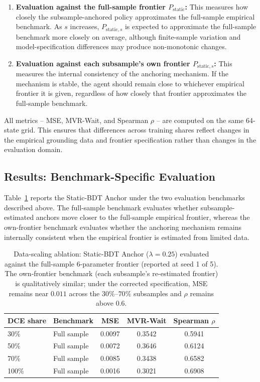 \documentclass[11pt]{article}
\begin{document}
\begin{enumerate}
    \item \textbf{Evaluation against the full-sample frontier \(P_{\mathrm{static}}\):} This measures how closely the subsample-anchored policy approximates the full-sample empirical benchmark. As \(s\) increases, \(P_{\mathrm{static},s}\) is expected to approximate the full-sample benchmark more closely on average, although finite-sample variation and model-specification differences may produce non-monotonic changes.

    \item \textbf{Evaluation against each subsample's own frontier \(P_{\mathrm{static},s}\):} This measures the internal consistency of the anchoring mechanism. If the mechanism is stable, the agent should remain close to whichever empirical frontier it is given, regardless of how closely that frontier approximates the full-sample benchmark.
\end{enumerate}

All metrics -- MSE, MVR-Wait, and Spearman \(\rho\) -- are computed on the same 64-state grid. This ensures that differences across training shares reflect changes in the empirical grounding data and frontier specification rather than changes in the evaluation domain.
\subsection{Results: Benchmark-Specific Evaluation}
\label{app:results_vs_full}

Table~\ref{tab:data_scaling_benchmarks} reports the Static-BDT Anchor under the two evaluation benchmarks described above. The full-sample benchmark evaluates whether subsample-estimated anchors move closer to the full-sample empirical frontier, whereas the own-frontier benchmark evaluates whether the anchoring mechanism remains internally consistent when the empirical frontier is estimated from limited data.

\begin{table}[htbp]
\centering
\caption{Data-scaling ablation: Static-BDT Anchor (\(\lambda = 0.25\)) evaluated against the full-sample 6-parameter frontier (reported at seed 1 of 5). The own-frontier benchmark (each subsample's re-estimated frontier) is qualitatively similar; under the corrected specification, MSE remains near $0.011$ across the $30\%$--$70\%$ subsamples and $\rho$ remains above $0.6$.}
\label{tab:data_scaling_benchmarks}
\begin{tabular}{llccc}
\toprule
DCE share & Benchmark & MSE & MVR-Wait & Spearman \(\rho\) \\
\midrule
30\% & Full sample & 0.0097 & 0.3542 & 0.5941 \\
50\% & Full sample & 0.0072 & 0.3646 & 0.6124 \\
70\% & Full sample & 0.0085 & 0.3438 & 0.6582 \\
100\% & Full sample & 0.0016 & 0.3021 & 0.6908 \\
\bottomrule
\end{tabular}
\end{table}
\end{document}

